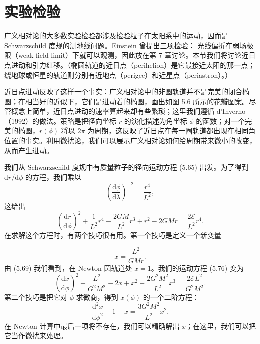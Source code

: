 \section{实验检验}

广义相对论的大多数实验检验都涉及检验粒子在太阳系中的运动，因而是 Schwarzschild 度规的测地线问题。Einstein 曾提出三项检验：
光线偏折在弱场极限（weak-field limit）下就可以观测，因此放在第 7 章讨论。本节我们将讨论近日点进动和引力红移。（椭圆轨道的近日点（perihelion）是它最接近太阳的那一点；绕地球或恒星的轨道则分别有近地点（perigee）和近星点（periastron）。）

近日点进动反映了这样一个事实：广义相对论中的非圆轨道并不是完美的闭合椭圆；在相当好的近似下，它们是进动着的椭圆，画出如图 5.6 所示的花瓣图案。尽管概念上简单，近日点进动的速率算起来却有些繁琐；这里我们遵循 d'Inverno（1992）的做法。策略是把径向坐标 $r$ 的演化描述为角坐标 $\phi$ 的函数；对一个完美的椭圆，$r(\phi)$ 将以 $2\pi$ 为周期，这反映了近日点在每一圈轨道都出现在相同角位置的事实。利用微扰论，我们可以展示广义相对论如何给周期带来微小的改变，从而产生进动。

我们从 Schwarzschild 度规中有质量粒子的径向运动方程 (5.65) 出发。为了得到 $\mathrm{d}r/\mathrm{d}\phi$ 的方程，我们乘以
\begin{equation*}
\left(\frac{\mathrm{d}\phi}{\mathrm{d}\lambda}\right)^{-2} = \frac{r^4}{L^2},
\tag{5.75}
\end{equation*}
这给出
\begin{equation*}
\left(\frac{\mathrm{d}r}{\mathrm{d}\phi}\right)^2 + \frac{1}{L^2}r^4 - \frac{2GM}{L^2}r^3 + r^2 - 2GMr = \frac{2\mathcal{E}}{L^2}r^4.
\tag{5.76}
\end{equation*}
在求解这个方程时，有两个技巧很有用。第一个技巧是定义一个新变量

\begin{equation*}
x = \frac{L^2}{GMr}.
\tag{5.77}
\end{equation*}
由 (5.69) 我们看到，在 Newton 圆轨道处 $x = 1$。我们的运动方程 (5.76) 变为
\begin{equation*}
\left(\frac{\mathrm{d}x}{\mathrm{d}\phi}\right)^2 + \frac{L^2}{G^2M^2} - 2x + x^2 - \frac{2G^2M^2}{L^2}x^3 = \frac{2\mathcal{E}L^2}{G^2M^2}.
\tag{5.78}
\end{equation*}
第二个技巧是把它对 $\phi$ 求微商，得到 $x(\phi)$ 的一个二阶方程：
\begin{equation*}
\frac{\mathrm{d}^2 x}{\mathrm{d}\phi^2} - 1 + x = \frac{3G^2M^2}{L^2}x^2.
\tag{5.79}
\end{equation*}
在 Newton 计算中最后一项将不存在，我们可以精确解出 $x$；在这里，我们可以把它当作微扰来处理。

